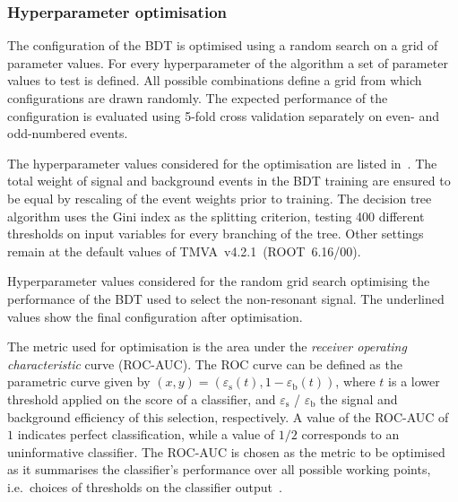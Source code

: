 \subsubsection{Hyperparameter optimisation}

The configuration of the BDT is optimised using a random search on a
grid of parameter values. For every hyperparameter of the algorithm a
set of parameter values to test is defined. All possible combinations
define a grid from which configurations are drawn randomly. The
expected performance of the configuration is evaluated using 5-fold
cross validation separately on even- and odd-numbered events.

The hyperparameter values considered for the optimisation are listed
in~. The total weight of signal and
background events in the BDT training are ensured to be equal by
rescaling of the event weights prior to training. The decision tree
algorithm uses the Gini index as the splitting criterion, testing 400
different thresholds on input variables for every branching of the
tree. Other settings remain at the default values of
TMVA~v4.2.1~(ROOT~6.16/00).

\begin{table}[htbp]
  \centering

  \caption{Hyperparameter values considered for the random grid search
    optimising the performance of the BDT used to select the
    non-resonant \HH signal. The underlined values show the final
    configuration after optimisation.}%
  \label{tab:hyperparameter_grid_bdt}

  
\end{table}

The metric used for optimisation is the area under the \emph{receiver
  operating characteristic} curve (ROC-AUC). The ROC curve can be
defined
as the parametric curve given by
$(x, y) = \left( \varepsilon_{\text{s}}(t), 1 -
  \varepsilon_{\text{b}}(t) \right)$, where $t$ is a lower threshold
applied on the score of a classifier, and $\varepsilon_\text{s}$ /
$\varepsilon_\text{b}$ the signal and background efficiency of this
selection, respectively. A value of the ROC-AUC of $1$ indicates
perfect classification, while a value of $1/2$ corresponds to an
uninformative classifier. The ROC-AUC is chosen as the metric to be
optimised as it summarises the classifier's performance over all
possible working points, i.e.~choices of thresholds on the classifier
output~\cite{james13}.

